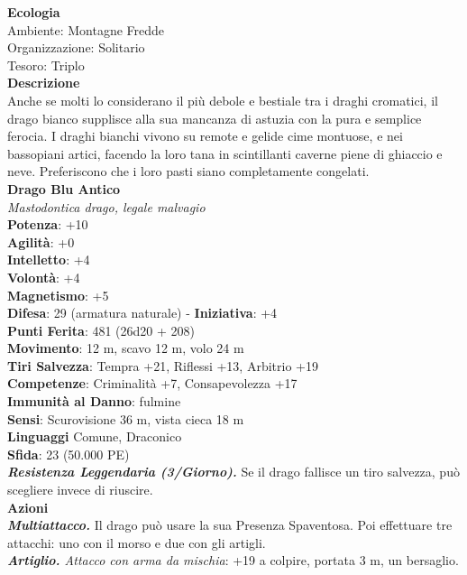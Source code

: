 \begin{multicols}{2}
\textbf{Ecologia}\\
Ambiente: Montagne Fredde\\
Organizzazione: Solitario\\
Tesoro: Triplo\\
\textbf{Descrizione}\\
Anche se molti lo considerano il più debole e bestiale tra i draghi cromatici, il drago bianco supplisce alla sua mancanza di astuzia con la pura e semplice ferocia. I draghi bianchi vivono su remote e gelide cime montuose, e nei bassopiani artici, facendo la loro tana in scintillanti caverne piene di ghiaccio e neve. Preferiscono che i loro pasti siano completamente congelati.\\


\medskip\textbf{Drago Blu Antico}\\
\emph{Mastodontica drago, legale malvagio}\\
\textbf{Potenza}: +10\\
\textbf{Agilità}: +0\\
\textbf{Intelletto}: +4\\
\textbf{Volontà}: +4\\
\textbf{Magnetismo}: +5\\	
\textbf{Difesa}: 29 (armatura naturale) - \textbf{Iniziativa}: +4\\
\textbf{Punti Ferita}: 481 (26d20 + 208)\\
\textbf{Movimento}: 12 m, scavo 12 m, volo 24 m\\
\textbf{Tiri Salvezza}: Tempra +21, Riflessi +13, Arbitrio +19\\
\textbf{Competenze}: Criminalità +7, Consapevolezza +17\\
\textbf{Immunità al Danno}: fulmine\\
\textbf{Sensi}: Scurovisione 36 m, vista cieca 18 m\\
\textbf{Linguaggi} Comune, Draconico\\
\textbf{Sfida}: 23 (50.000 PE)\smallskip\\
\emph{\textbf{Resistenza Leggendaria (3/Giorno).}} Se il drago fallisce un tiro salvezza, può scegliere invece di riuscire. \\
\smallskip\textbf{Azioni}\\
\emph{\textbf{Multiattacco.}} Il drago può usare la sua Presenza Spaventosa. Poi effettuare tre attacchi: uno con il morso e due con gli artigli.\\
\emph{\textbf{Artiglio.} Attacco con arma da mischia}: +19 a colpire, portata 3 m, un bersaglio.\\

\end{multicols}
